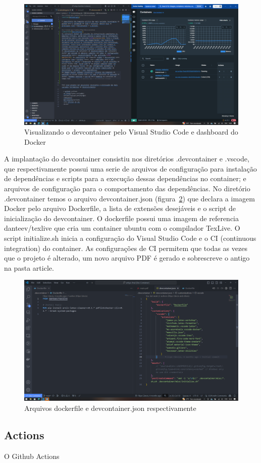 \begin{figure}[ht]
	\centering
	\includegraphics[width=.5\textwidth]{./images/image13.png}
	\caption{Visualizando o devcontainer pelo Visual Studio Code e dashboard do Docker}
	\label{fig:image13}
\end{figure}
A implantação do devcontainer consistiu nos diretórios .devcontainer e .vscode, que respectivamente possui uma serie de arquivos de configuração para instalação de dependências e scripts para a execução dessas dependências no container; e arquivos de configuração para o comportamento das dependências.
No diretório .devcontainer temos o arquivo devcontainer.json (figura~\ref{fig:image14}) que declara a imagem Docker pelo arquivo Dockerfile, a lista de extensões desejáveis e o script de inicialização do devcontainer. O dockerfile possui uma imagem de referencia  danteev/texlive que cria um container ubuntu com o compilador TexLive. O script initialize.sh inicia a configuração do Visual Studio Code e o CI (continuous integration) do container. As configurações de CI permitem que todas as vezes que o projeto é alterado, um novo arquivo PDF é gerado e sobrescreve o antigo na pasta article.

\begin{figure}[ht]
	\centering
	\includegraphics[width=.5\textwidth]{./images/image14.png}
	\caption{Arquivos dockerfile e devcontainer.json respectivamente}
	\label{fig:image14}
\end{figure}


\subsection{Actions}
O Github Actions 

